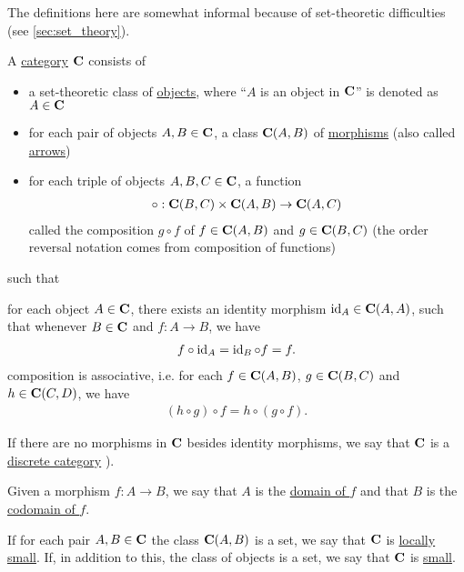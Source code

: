 \begin{note}
  The definitions here are somewhat informal because of set-theoretic difficulties (see \cref{sec:set_theory}).
\end{note}

\begin{definition}\label{def:category}\cite[definition 1.1.1]{Leinster2014}
  A \uline{category} $\operatorname{\mathbf{C}}$ consists of
  \begin{itemize}
    \item a set-theoretic class of \uline{objects}, where \enquote{$A$ is an object in $\operatorname{\mathbf{C}}$} is denoted as $A \in \operatorname{\mathbf{C}}$
    \item for each pair of objects $A, B \in \operatorname{\mathbf{C}}$, a class ${\operatorname{\mathbf{C}}}(A, B)$ of \uline{morphisms} (also called \uline{arrows})
    \item for each triple of objects $A, B, C \in \operatorname{\mathbf{C}}$, a function
    \begin{align*}
      \circ: {\operatorname{\mathbf{C}}}(B, C) \times {\operatorname{\mathbf{C}}}(A, B) \to {\operatorname{\mathbf{C}}}(A, C)
    \end{align*}
    called the composition $g \circ f$ of $f \in {\operatorname{\mathbf{C}}}(A, B)$ and $g \in {\operatorname{\mathbf{C}}}(B, C)$ (the order reversal notation comes from composition of functions)
  \end{itemize}
  such that
  \begin{description}
     for each object $A \in \operatorname{\mathbf{C}}$, there exists an identity morphism $\operatorname{id}_A \in {\operatorname{\mathbf{C}}}(A, A)$, such that whenever $B \in \operatorname{\mathbf{C}}$ and $f: A \to B$, we have
    \begin{align*}
      f \circ \operatorname{id}_A = \operatorname{id}_B \circ f = f.
    \end{align*}
     composition is associative, i.e. for each $f \in {\operatorname{\mathbf{C}}}(A, B)$, $g \in {\operatorname{\mathbf{C}}}(B, C)$ and $h \in {\operatorname{\mathbf{C}}}(C, D)$, we have
    \begin{align*}
      (h \circ g) \circ f = h \circ (g \circ f).
    \end{align*}
  \end{description}

  If there are no morphisms in $\operatorname{\mathbf{C}}$ besides identity morphisms, we say that $\operatorname{\mathbf{C}}$ is a \uline{discrete category} \cite[example 1.1.18(b]{Leinster2014}).

  Given a morphism $f: A \to B$, we say that $A$ is the \uline{domain of $f$} and that $B$ is the \uline{codomain of $f$}.

  If for each pair $A, B \in \operatorname{\mathbf{C}}$ the class $\operatorname{\mathbf{C}}(A, B)$ is a set, we say that $\operatorname{\mathbf{C}}$ is \uline{locally small}. If, in addition to this, the class of objects is a set, we say that $\operatorname{\mathbf{C}}$ is \uline{small}.
\end{definition}

